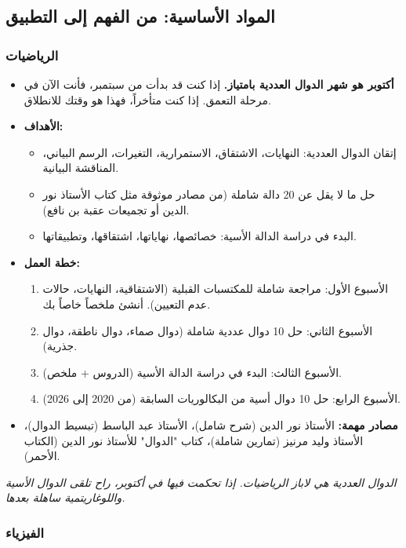 \documentclass[12pt,a4paper]{book}
\newcommand{\quoteAr}[1]{%
	\begin{myquote}
		\itshape #1
	\end{myquote}
}
\begin{document}
	\subsection{المواد الأساسية: من الفهم إلى التطبيق}
	
	\subsubsection{الرياضيات}
	
	
	\begin{itemize}
		\item \textbf{أكتوبر هو شهر الدوال العددية بامتياز.} إذا كنت قد بدأت من سبتمبر، فأنت الآن في مرحلة التعمق. إذا كنت متأخراً، فهذا هو وقتك للانطلاق.
		\item \textbf{الأهداف:}
		\begin{itemize}
			\item إتقان الدوال العددية: النهايات، الاشتقاق، الاستمرارية، التغيرات، الرسم البياني، المناقشة البيانية.
			\item حل ما لا يقل عن 20 دالة شاملة (من مصادر موثوقة مثل كتاب الأستاذ نور الدين أو تجميعات عقبة بن نافع).
			\item البدء في دراسة الدالة الأسية: خصائصها، نهاياتها، اشتقاقها، وتطبيقاتها.
		\end{itemize}
		\item \textbf{خطة العمل:}
		\begin{enumerate}
			\item الأسبوع الأول: مراجعة شاملة للمكتسبات القبلية (الاشتقاقية، النهايات، حالات عدم التعيين). أنشئ ملخصاً خاصاً بك.
			\item الأسبوع الثاني: حل 10 دوال عددية شاملة (دوال صماء، دوال ناطقة، دوال جذرية).
			\item الأسبوع الثالث: البدء في دراسة الدالة الأسية (الدروس + ملخص).
			\item الأسبوع الرابع: حل 10 دوال أسية من البكالوريات السابقة (من 2020 إلى 2026).
		\end{enumerate}
		\item \textbf{مصادر مهمة:} الأستاذ نور الدين (شرح شامل)، الأستاذ عبد الباسط (تبسيط الدوال)، الأستاذ وليد مرنيز (تمارين شاملة)، كتاب "الدوال" للأستاذ نور الدين (الكتاب الأحمر).
	\end{itemize}
	
	\quoteAr{الدوال العددية هي لاباز الرياضيات. إذا تحكمت فيها في أكتوبر، راح تلقى الدوال الأسية واللوغاريتمية ساهلة بعدها.}
	
	\subsubsection{الفيزياء}
	
\end{document}

